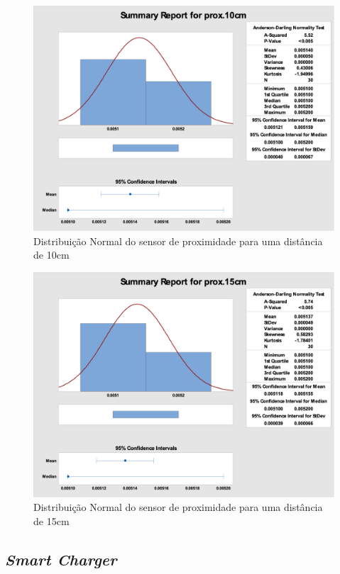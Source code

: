 		\pagebreak
		\begin{figure}[!ht]
			   \centering
			   \includegraphics[width=14cm]{Figures/DNsensor10.png}
			   \caption{Distribuição Normal do sensor de proximidade para uma distância de 10cm}
			   \label{fig:DNgraph10}
		\end{figure}    
		
		\begin{figure}[!ht]
			   \centering
			   \includegraphics[width=14cm]{Figures/DNsensor15.png}
			   \caption{Distribuição Normal do sensor de proximidade para uma distância de 15cm}
			   \label{fig:DNgraph15}
		\end{figure}      
		
	\subsection{\textit{Smart Charger}}
    
